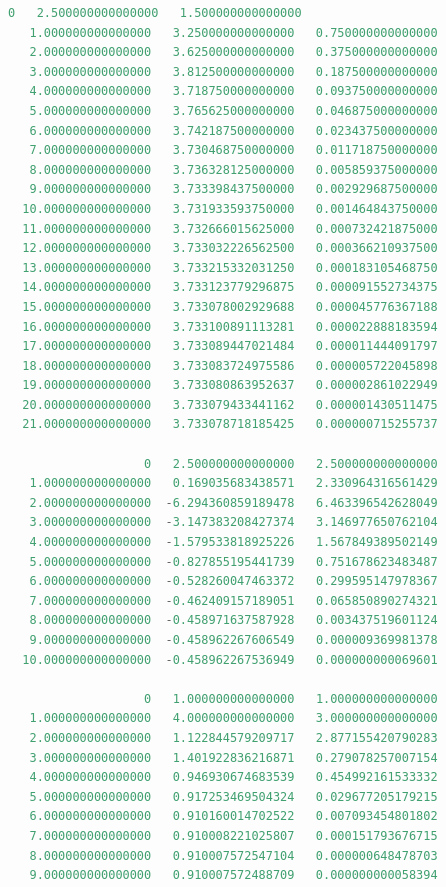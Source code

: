 \begin{lstlisting}[language = MATLAB]
                   0   2.500000000000000   1.500000000000000
   1.000000000000000   3.250000000000000   0.750000000000000
   2.000000000000000   3.625000000000000   0.375000000000000
   3.000000000000000   3.812500000000000   0.187500000000000
   4.000000000000000   3.718750000000000   0.093750000000000
   5.000000000000000   3.765625000000000   0.046875000000000
   6.000000000000000   3.742187500000000   0.023437500000000
   7.000000000000000   3.730468750000000   0.011718750000000
   8.000000000000000   3.736328125000000   0.005859375000000
   9.000000000000000   3.733398437500000   0.002929687500000
  10.000000000000000   3.731933593750000   0.001464843750000
  11.000000000000000   3.732666015625000   0.000732421875000
  12.000000000000000   3.733032226562500   0.000366210937500
  13.000000000000000   3.733215332031250   0.000183105468750
  14.000000000000000   3.733123779296875   0.000091552734375
  15.000000000000000   3.733078002929688   0.000045776367188
  16.000000000000000   3.733100891113281   0.000022888183594
  17.000000000000000   3.733089447021484   0.000011444091797
  18.000000000000000   3.733083724975586   0.000005722045898
  19.000000000000000   3.733080863952637   0.000002861022949
  20.000000000000000   3.733079433441162   0.000001430511475
  21.000000000000000   3.733078718185425   0.000000715255737

                   0   2.500000000000000   2.500000000000000
   1.000000000000000   0.169035683438571   2.330964316561429
   2.000000000000000  -6.294360859189478   6.463396542628049
   3.000000000000000  -3.147383208427374   3.146977650762104
   4.000000000000000  -1.579533818925226   1.567849389502149
   5.000000000000000  -0.827855195441739   0.751678623483487
   6.000000000000000  -0.528260047463372   0.299595147978367
   7.000000000000000  -0.462409157189051   0.065850890274321
   8.000000000000000  -0.458971637587928   0.003437519601124
   9.000000000000000  -0.458962267606549   0.000009369981378
  10.000000000000000  -0.458962267536949   0.000000000069601

                   0   1.000000000000000   1.000000000000000
   1.000000000000000   4.000000000000000   3.000000000000000
   2.000000000000000   1.122844579209717   2.877155420790283
   3.000000000000000   1.401922836216871   0.279078257007154
   4.000000000000000   0.946930674683539   0.454992161533332
   5.000000000000000   0.917253469504324   0.029677205179215
   6.000000000000000   0.910160014702522   0.007093454801802
   7.000000000000000   0.910008221025807   0.000151793676715
   8.000000000000000   0.910007572547104   0.000000648478703
   9.000000000000000   0.910007572488709   0.000000000058394
\end{lstlisting}
